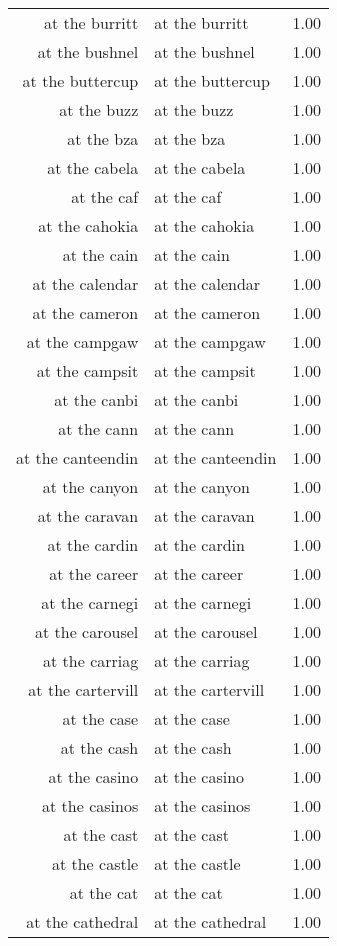 \begin{table}[ht]
\begin{tabular}{rlr}
  at the burritt & at the burritt & 1.00 \\ 
  at the bushnel & at the bushnel & 1.00 \\ 
  at the buttercup & at the buttercup & 1.00 \\ 
  at the buzz & at the buzz & 1.00 \\ 
  at the bza & at the bza & 1.00 \\ 
  at the cabela & at the cabela & 1.00 \\ 
  at the caf & at the caf & 1.00 \\ 
  at the cahokia & at the cahokia & 1.00 \\ 
  at the cain & at the cain & 1.00 \\ 
  at the calendar & at the calendar & 1.00 \\ 
  at the cameron & at the cameron & 1.00 \\ 
  at the campgaw & at the campgaw & 1.00 \\ 
  at the campsit & at the campsit & 1.00 \\ 
  at the canbi & at the canbi & 1.00 \\ 
  at the cann & at the cann & 1.00 \\ 
  at the canteendin & at the canteendin & 1.00 \\ 
  at the canyon & at the canyon & 1.00 \\ 
  at the caravan & at the caravan & 1.00 \\ 
  at the cardin & at the cardin & 1.00 \\ 
  at the career & at the career & 1.00 \\ 
  at the carnegi & at the carnegi & 1.00 \\ 
  at the carousel & at the carousel & 1.00 \\ 
  at the carriag & at the carriag & 1.00 \\ 
  at the cartervill & at the cartervill & 1.00 \\ 
  at the case & at the case & 1.00 \\ 
  at the cash & at the cash & 1.00 \\ 
  at the casino & at the casino & 1.00 \\ 
  at the casinos & at the casinos & 1.00 \\ 
  at the cast & at the cast & 1.00 \\ 
  at the castle & at the castle & 1.00 \\ 
  at the cat & at the cat & 1.00 \\ 
  at the cathedral & at the cathedral & 1.00 \\ 

\end{tabular}
\end{table}
